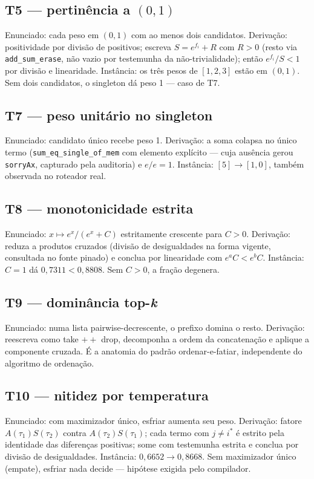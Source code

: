 \subsection{T5 --- pertinência a $(0,1)$}
Enunciado: cada peso em $(0,1)$ com ao menos dois candidatos. Derivação: positividade por divisão de positivos; escreva $S=e^{f_i}+R$ com $R>0$ (resto via \texttt{add\_sum\_erase}, não vazio por testemunha da não-trivialidade); então $e^{f_i}/S<1$ por divisão e linearidade. Instância: os três pesos de $[1,2,3]$ estão em $(0,1)$. Sem dois candidatos, o singleton dá peso 1 --- caso de T7.
\subsection{T7 --- peso unitário no singleton}
Enunciado: candidato único recebe peso 1. Derivação: a soma colapsa no único termo (\texttt{sum\_eq\_single\_of\_mem} com elemento explícito --- cuja ausência gerou \texttt{sorryAx}, capturado pela auditoria) e $e/e=1$. Instância: $[5]\to[1{,}0]$, também observada no roteador real.
\subsection{T8 --- monotonicidade estrita}
Enunciado: $x\mapsto e^x/(e^x+C)$ estritamente crescente para $C>0$. Derivação: reduza a produtos cruzados (divisão de desigualdades na forma vigente, consultada no fonte pinado) e conclua por linearidade com $e^aC<e^bC$. Instância: $C=1$ dá $0{,}7311<0{,}8808$. Sem $C>0$, a fração degenera.
\subsection{T9 --- dominância top-\textit{k}}
Enunciado: numa lista pairwise-decrescente, o prefixo domina o resto. Derivação: reescreva como take $++$ drop, decomponha a ordem da concatenação e aplique a componente cruzada. É a anatomia do padrão ordenar-e-fatiar, independente do algoritmo de ordenação.
\subsection{T10 --- nitidez por temperatura}
Enunciado: com maximizador único, esfriar aumenta seu peso. Derivação: fatore $A(\tau_1)S(\tau_2)$ contra $A(\tau_2)S(\tau_1)$; cada termo com $j\neq i^*$ é estrito pela identidade das diferenças positivas; some com testemunha estrita e conclua por divisão de desigualdades. Instância: $0{,}6652\to0{,}8668$. Sem maximizador único (empate), esfriar nada decide --- hipótese exigida pelo compilador.
